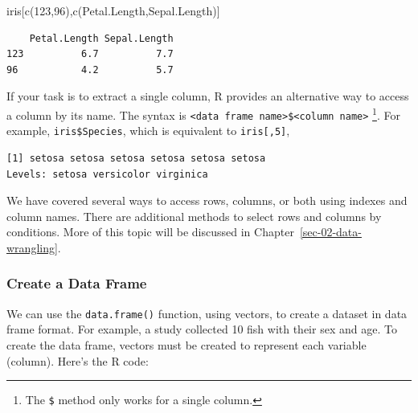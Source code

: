 \documentclass[
  letterpaper,
  DIV=11,
  numbers=noendperiod]{scrreprt}
\newenvironment{Shaded}{\begin{snugshade}}{\end{snugshade}}
\newcommand{\DecValTok}[1]{\textcolor[rgb]{0.68,0.00,0.00}{#1}}
\newcommand{\FunctionTok}[1]{\textcolor[rgb]{0.28,0.35,0.67}{#1}}
\newcommand{\NormalTok}[1]{\textcolor[rgb]{0.00,0.23,0.31}{#1}}
\newcommand{\SpecialCharTok}[1]{\textcolor[rgb]{0.37,0.37,0.37}{#1}}
\newcommand{\StringTok}[1]{\textcolor[rgb]{0.13,0.47,0.30}{#1}}
\begin{document}
\begin{Shaded}
\begin{Highlighting}[]
\NormalTok{iris[}\FunctionTok{c}\NormalTok{(}\DecValTok{123}\NormalTok{,}\DecValTok{96}\NormalTok{),}\FunctionTok{c}\NormalTok{(}\StringTok{\textquotesingle{}Petal.Length\textquotesingle{}}\NormalTok{,}\StringTok{\textquotesingle{}Sepal.Length\textquotesingle{}}\NormalTok{)]}
\end{Highlighting}
\end{Shaded}

\begin{verbatim}
    Petal.Length Sepal.Length
123          6.7          7.7
96           4.2          5.7
\end{verbatim}

If your task is to extract a single column, R provides an alternative
way to access a column by its name. The syntax is
\texttt{\textless{}data\ frame\ name\textgreater{}\$\textless{}column\ name\textgreater{}}
\footnote{The \texttt{\$} method only works for a single column.}. For
example, \texttt{iris\$Species}, which is equivalent to
\texttt{iris{[},5{]}},

\begin{Shaded}
\end{Shaded}

\begin{verbatim}
[1] setosa setosa setosa setosa setosa setosa
Levels: setosa versicolor virginica
\end{verbatim}

We have covered several ways to access rows, columns, or both using
indexes and column names. There are additional methods to select rows
and columns by conditions. More of this topic will be discussed in
Chapter~\ref{sec-02-data-wrangling}.

\subsubsection{Create a Data Frame}\label{create-a-data-frame}

We can use the \texttt{data.frame()} function, using vectors, to create
a dataset in data frame format. For example, a study collected 10 fish
with their sex and age. To create the data frame, vectors must be
created to represent each variable (column). Here's the R code:
\end{document}
